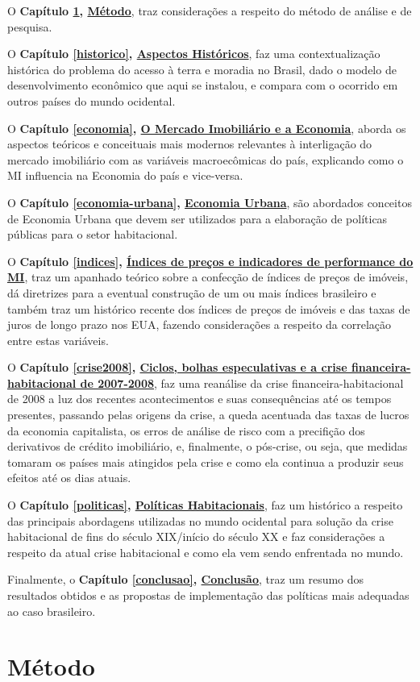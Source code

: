 \documentclass[
	12pt,				%
	oneside,			%
	a4paper,			%
	chapter=TITLE,		%
	section=TITLE,		%
	english,			%
	brazil				%
	]{abntex2}
\begin{document}
\begin{refsection}
O \textbf{Capítulo \ref{metodo}, \protect\hyperlink{metodo}{Método}}, traz considerações a respeito do método de análise e
de pesquisa.

O \textbf{Capítulo \ref{historico}, \protect\hyperlink{historico}{Aspectos Históricos}}, faz uma contextualização
histórica do problema do acesso à terra e moradia no Brasil, dado o modelo de
desenvolvimento econômico que aqui se instalou, e compara com o ocorrido em
outros países do mundo ocidental.

O \textbf{Capítulo \ref{economia}, \protect\hyperlink{economia}{O Mercado Imobiliário e a Economia}}, aborda os
aspectos teóricos e conceituais mais modernos relevantes à interligação do
mercado imobiliário com as variáveis macroecômicas do país, explicando como o
\gls{MI} influencia na Economia do país e vice-versa.

O \textbf{Capítulo \ref{economia-urbana}, \protect\hyperlink{economia-urbana}{Economia Urbana}}, são abordados conceitos
de Economia Urbana que devem ser utilizados para a elaboração de políticas
públicas para o setor habitacional.

O \textbf{Capítulo \ref{indices}, \protect\hyperlink{indices}{Índices de preços e indicadores de performance do
\gls{MI}}}, traz um apanhado teórico sobre a confecção de índices de preços de
imóveis, dá diretrizes para a eventual construção de um ou mais índices
brasileiro e também traz um histórico recente dos índices de preços de imóveis e
das taxas de juros de longo prazo nos \gls{EUA}, fazendo considerações a
respeito da correlação entre estas variáveis.

O \textbf{Capítulo \ref{crise2008}, \protect\hyperlink{crise2008}{Ciclos, bolhas especulativas e a crise
financeira-habitacional de 2007-2008}}, faz uma reanálise da crise
financeira-habitacional de 2008 a luz dos recentes acontecimentos e suas
consequências até os tempos presentes, passando pelas origens da crise, a queda
acentuada das taxas de lucros da economia capitalista, os erros de análise de
risco com a precifição dos derivativos de crédito imobiliário, e, finalmente, o
pós-crise, ou seja, que medidas tomaram os países mais atingidos pela crise e
como ela continua a produzir seus efeitos até os dias atuais.

O \textbf{Capítulo \ref{politicas}, \protect\hyperlink{politicas}{Políticas Habitacionais}}, faz um histórico a
respeito das principais abordagens utilizadas no mundo ocidental para solução da
crise habitacional de fins do século XIX/início do século XX e faz considerações
a respeito da atual crise habitacional e como ela vem sendo enfrentada no mundo.

Finalmente, o \textbf{Capítulo \ref{conclusao}, \protect\hyperlink{conclusao}{Conclusão}}, traz um resumo dos
resultados obtidos e as propostas de implementação das políticas mais adequadas
ao caso brasileiro.

\printbibliography[heading=subbibintoc]
\end{refsection}
\hypertarget{metodo}{%
\chapter{Método}\label{metodo}}
\end{document}
